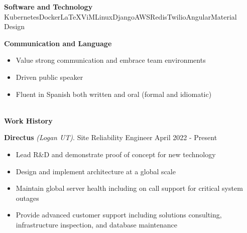 \documentclass[letterpaper,11pt]{article}
\begin{document}
\textbf{Software and Technology}\\
Kubernetes\hfill Docker\hfill \LaTeX\hfill ViM\hfill Linux\hfill Django\hfill AWS\hfill Redis\hfill Twilio\hfill Angular\hfill Material Design

\noindent\textbf{Communication and Language}
\begin{itemize}[noitemsep,topsep=0pt]
	\item Value strong communication and embrace team environments
	\item Driven public speaker
	\item Fluent in Spanish both written and oral (formal and idiomatic)
\end{itemize}


\begin{Large}\textbf{\\Work History}\end{Large}

\textbf{Directus} \textit{(Logan UT)}. Site Reliability Engineer \hfill April 2022 - Present
\begin{itemize}[noitemsep,topsep=0pt]
	\item Lead R\&D and demonstrate proof of concept for new technology
	\item Design and implement architecture at a global scale
	\item Maintain global server health including on call support for critical system outages
	\item Provide advanced customer support including solutions consulting, infrastructure inspection, and database maintenance\\
\end{itemize}
\end{document}
